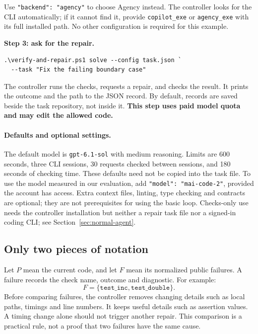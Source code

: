 \documentclass[10pt,twocolumn,a4paper]{article}
\begin{document}
Use \texttt{"backend": "agency"} to choose Agency instead. The controller
looks for the CLI automatically; if it cannot find it, provide
\texttt{copilot\_exe} or \texttt{agency\_exe} with its full installed path.
No other configuration is required for this example.

\noindent\textbf{Step 3: ask for the repair.}\par
\begin{lstlisting}
.\verify-and-repair.ps1 solve --config task.json `
  --task "Fix the failing boundary case"
\end{lstlisting}
The controller runs the checks, requests a repair, and checks the result.
It prints the outcome and the path to the JSON record. By default, records
are saved beside the task repository, not inside it.
\textbf{This step uses paid model quota and may edit the allowed code.}

\paragraph{Defaults and optional settings.}
The default model is \texttt{gpt-6.1-sol} with medium reasoning. Limits are
600 seconds, three CLI sessions, 30 requests checked between sessions, and
180 seconds of checking time. These defaults need not be copied into the
task file. To use the model measured in our evaluation, add
\texttt{"model": "mai-code-2"}, provided the account has access.
Extra context files, linting, type checking and contracts are optional;
they are not prerequisites for using the basic loop.
Checks-only use needs the controller installation but neither a repair task
file nor a signed-in coding CLI; see Section~\ref{sec:normal-agent}.

\subsection{Only two pieces of notation}
Let $P$ mean the current code, and let $F$ mean its normalized public
failures. A failure records the check name, outcome and diagnostic.
For example:
\[
F=\{\texttt{test\_inc},\texttt{test\_double}\}.
\]
Before comparing failures, the controller removes changing details such as
local paths, timings and line numbers. It keeps useful details such as
assertion values. A timing change alone should not trigger another repair.
This comparison is a practical rule, not a proof that two failures have
the same cause.
\end{document}
